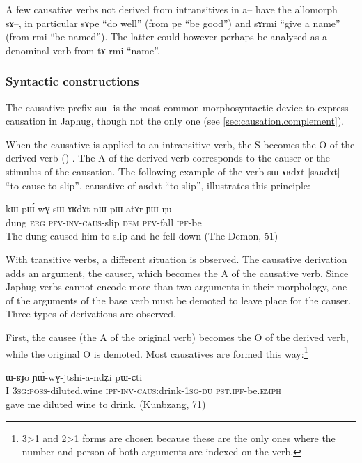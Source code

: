 \documentclass[oldfontcommands,oneside,a4paper,11pt]{memoir}
\newcommand{\ipa}[1]{{\phon #1}} %
\newcommand{\jg}[1]{\ipa{#1}\index{Japhug #1}}
\newcommand{\caus}{\textsc{caus}}
\newcommand{\dem}{\textsc{dem}}
\newcommand{\du}{\textsc{du}}
\newcommand{\erg}{\textsc{erg}}
\newcommand{\emphat}{\textsc{emph}}
\newcommand{\inv}{\textsc{inv}}
\newcommand{\ipf}{\textsc{ipf}}
\newcommand{\pfv}{\textsc{pfv}}
\newcommand{\poss}{\textsc{poss}}
\newcommand{\pst}{\textsc{pst}}
\newcommand{\sg}{\textsc{sg}}
\begin{document}
A few causative verbs not derived from intransitives in \ipa{a}-- have the allomorph \ipa{sɤ}--, in particular \ipa{sɤpe} ``do well'' (from \ipa{pe} ``be good'') and \ipa{sɤrmi} ``give a name'' (from \ipa{rmi} ``be named''). The latter could however perhaps be analysed as a denominal verb from \ipa{tɤ-rmi} ``name''.


\subsubsection{Syntactic constructions} \label{subsub:causation}
The causative prefix \ipa{sɯ-} is the most common morphosyntactic device to express causation in Japhug, though not the only one (see \ref{sec:causation.complement}).

When the causative is applied to an intransitive verb, the S becomes the O of the derived verb (\citet[45]{dixon00causative}) . The A of the derived verb corresponds to the causer  or the stimulus of the causation.  The following example of the verb \jg{sɯ-ɤʁdɤt} [saʁdɤt] ``to cause to slip'', causative of \jg{aʁdɤt} ``to slip'', illustrates this principle:
\begin{exe}
\ex
\gll \ipa{tɯqe} 	\ipa{kɯ} 	\ipa{pɯ́-wɣ-sɯ-ɤʁdɤt} 	\ipa{nɯ} 	\ipa{pɯ-atɤr} 	\ipa{ɲɯ-ŋu} \\
dung \erg{} \pfv{}-\inv{}-\caus{}-slip \dem{} \pfv{}-fall \ipf{}-be \\
 \glt The dung caused him to slip and he fell down (The Demon, 51)
\end{exe} 



With transitive verbs, a different situation is observed. The causative derivation adds an argument, the causer, which becomes the A of the causative verb. Since Japhug verbs cannot encode more than two arguments in their morphology, one of the arguments of the base verb must be demoted to leave place for the causer.  Three types of derivations are observed.

First, the causee (the A of the original verb) becomes the O of the derived verb, while the original O is demoted. Most causatives are formed this way:\footnote{3>1 and 2>1 forms are chosen because these are the only ones where the number and person of both arguments are indexed on the verb.}
 \begin{exe}
\ex
\gll  \ipa{aʑo} 	\ipa{ɯ-ʁɟo} 	\ipa{ɲɯ́-wɣ-jtshi-a-ndʑi} 	\ipa{pɯ-ɕti}  \\
  I 3\sg{}:\poss{}-diluted.wine \ipf{}-\inv{}-\caus{}:drink-1\sg{}-\du{} \pst{}.\ipf{}-be.\emphat{} \\
   gave me diluted wine to drink. (Kunbzang, 71)
\end{exe} 
 
\end{document}
